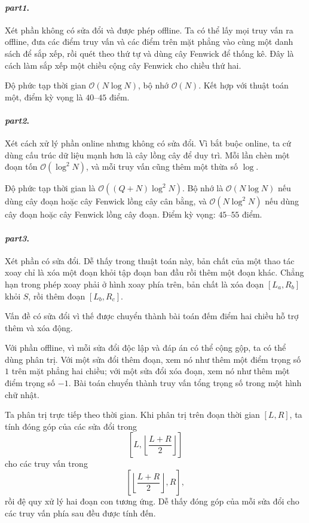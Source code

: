 \documentclass[11pt]{article}
\newcommand{\Oh}{\mathcal{O}}
\begin{document}
\paragraph{\emph{part1}.}
Xét phần không có sửa đổi và được phép offline. Ta có thể lấy mọi truy vấn ra
offline, đưa các điểm truy vấn và các điểm trên mặt phẳng vào cùng một danh
sách để sắp xếp, rồi quét theo thứ tự và dùng cây Fenwick để thống kê. Đây là
cách làm sắp xếp một chiều cộng cây Fenwick cho chiều thứ hai.

Độ phức tạp thời gian \(\Oh(N\log N)\), bộ nhớ \(\Oh(N)\). Kết hợp với thuật
toán một, điểm kỳ vọng là \(40\)--\(45\) điểm.

\paragraph{\emph{part2}.}
Xét cách xử lý phần online nhưng không có sửa đổi. Vì bắt buộc online, ta cứ
dùng cấu trúc dữ liệu mạnh hơn là cây lồng cây để duy trì. Mỗi lần chèn một
đoạn tốn \(\Oh(\log^2 N)\), và mỗi truy vấn cũng thêm một thừa số \(\log\).

Độ phức tạp thời gian là \(\Oh((Q+N)\log^2 N)\). Bộ nhớ là
\(\Oh(N\log N)\) nếu dùng cây đoạn hoặc cây Fenwick lồng cây cân bằng, và
\(\Oh(N\log^2 N)\) nếu dùng cây đoạn hoặc cây Fenwick lồng cây đoạn. Điểm kỳ
vọng: \(45\)--\(55\) điểm.

\paragraph{\emph{part3}.}
Xét phần có sửa đổi. Dễ thấy trong thuật toán này, bản chất của một thao tác
xoay chỉ là xóa một đoạn khỏi tập đoạn ban đầu rồi thêm một đoạn khác. Chẳng
hạn trong phép xoay phải ở hình xoay phía trên, bản chất là xóa đoạn
\([L_a,R_b]\) khỏi \(S\), rồi thêm đoạn \([L_b,R_c]\).

Vấn đề có sửa đổi vì thế được chuyển thành bài toán đếm điểm hai chiều hỗ trợ
thêm và xóa động.

Với phần offline, vì mỗi sửa đổi độc lập và đáp án có thể cộng gộp, ta có thể
dùng phân trị. Với một sửa đổi thêm đoạn, xem nó như thêm một điểm trọng số
\(1\) trên mặt phẳng hai chiều; với một sửa đổi xóa đoạn, xem nó như thêm một
điểm trọng số \(-1\). Bài toán chuyển thành truy vấn tổng trọng số trong một
hình chữ nhật.

Ta phân trị trực tiếp theo thời gian. Khi phân trị trên đoạn thời gian
\([L,R]\), ta tính đóng góp của các sửa đổi trong
\[
  \left[L,\left\lfloor\frac{L+R}{2}\right\rfloor\right]
\]
cho các truy vấn trong
\[
  \left[\left\lfloor\frac{L+R}{2}\right\rfloor,R\right],
\]
rồi đệ quy xử lý hai đoạn con tương ứng. Dễ thấy đóng góp của mỗi sửa đổi cho
các truy vấn phía sau đều được tính đến.
\end{document}
